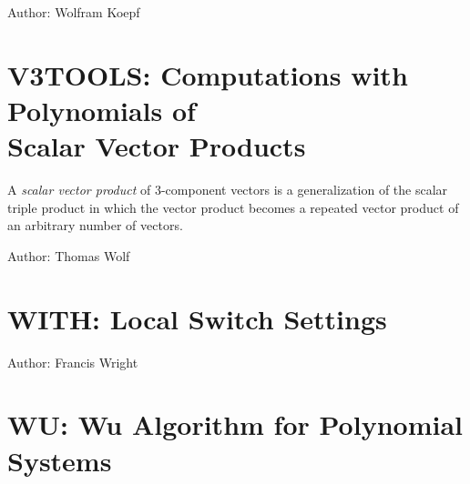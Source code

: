 \label{TRIGSIMP}

\iffalse
TRIGSIMP is a useful tool for all kinds of trigonometric and hyperbolic
simplification and factorization.  There are three procedures included in
TRIGSIMP: trigsimp, trigfactorize and triggcd.  The first is for finding
simplifications of trigonometric or hyperbolic expressions with many
options, the second for factorizing them and the third for finding the
greatest common divisor of two trigonometric or hyperbolic polynomials.
\fi
Author: Wolfram Koepf



\fi
\iffalse
\newpage

\section{TURTLE: Turtle Graphics Interface for \REDUCE}

\indexpackage{TURTLE}
Author: Caroline Cotter


\fi

\newpage

\section[V3TOOLS: Computations with Polynomials of Scalar Vector Products]{V3TOOLS: Computations with Polynomials of\\Scalar Vector Products}

A \emph{scalar vector product} of 3-component vectors is a
generalization of the scalar triple product in which the vector
product becomes a repeated vector product of an arbitrary number of
vectors.

Author: Thomas Wolf



\newpage

\section{WITH: Local Switch Settings}

Author: Francis Wright



\newpage

\section{WU: Wu Algorithm for Polynomial Systems}

